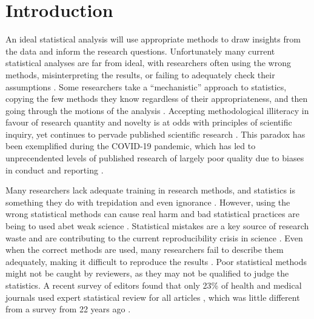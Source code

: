 \documentclass[12pt]{article}
\begin{document}
\newpage
{} %

\hypertarget{introduction}{%
\section{Introduction}\label{introduction}}

An ideal statistical analysis will use appropriate methods to draw
insights from the data and inform the research questions. Unfortunately
many current statistical analyses are far from ideal, with 
researchers often using the wrong methods, misinterpreting the results, or
failing to adequately check their assumptions \citep{2008, Leek2017}.
Some researchers take a ``mechanistic'' approach to statistics, copying
the few methods they know regardless of their appropriateness, and then
going through the motions of the analysis \citep{Stark2018}. Accepting methodological illiteracy in favour of 
research quantity and novelty is at odds
with principles of scientific inquiry, yet continues to pervade published scientific research \citep{VanCalster2021}. 
This paradox has been exemplified during the COVID-19 pandemic, which has led to unprecendented levels of published research of largely 
poor quality due to biases in conduct and reporting \citep{Glasziou2020,Wynants2020}.

Many researchers lack adequate training in research methods, and
statistics is something they do with trepidation and even ignorance
\citep{Altman1994, King2019}. However, using the wrong statistical
methods can cause real harm \citep{Altman1994, Brown2018} and bad
statistical practices are being to used abet weak science
\citep{Stark2018}. Statistical mistakes are a key source of research waste and are contributing to 
the current reproducibility crisis in
science \citep{Allison2016}. Even when the correct methods are used,
many researchers fail to describe them adequately, making it difficult
to reproduce the results \citep{Ernst2017, Zhou2018}. Poor statistical
methods might not be caught by reviewers, as they may not be qualified
to judge the statistics. A recent survey of editors found that only 23\%
of health and medical journals used expert statistical review for all
articles \citep{Hardwicke2020}, which was little different from a survey
from 22 years ago \citep{Goodman1998}.
\end{document}
